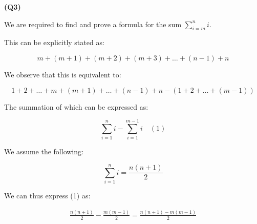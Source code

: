 \documentclass[12pt, a4paper]{article}
\begin{document}
\noindent\textbf{(Q3)}

We are required to find and prove a formula for the sum $\displaystyle\sum_{i = m}^{n} i$.

This can be explicitly stated as:

\[
    m + (m + 1) + (m + 2) + (m + 3) + \ldots + (n - 1) + n
\]

We observe that this is equivalent to:

\[
    1 + 2 + \ldots + m + (m + 1) + \ldots + (n - 1) + n - (1 + 2 + \ldots + (m - 1))
\]

The summation of which can be expressed as:

\[
    \sum_{i = 1}^{n} i - \sum_{i = 1}^{m - 1} i \quad (1)
\]

We assume the following:

\[
    \sum_{i = 1}^{n} i = \frac{n(n + 1)}{2}
\]

We can thus express (1) as:

\begin{align*}
    \frac{n(n + 1)}{2} - \frac{m(m - 1)}{2} = \frac{n(n + 1) - m(m - 1)}{2}
\end{align*}
\end{document}
